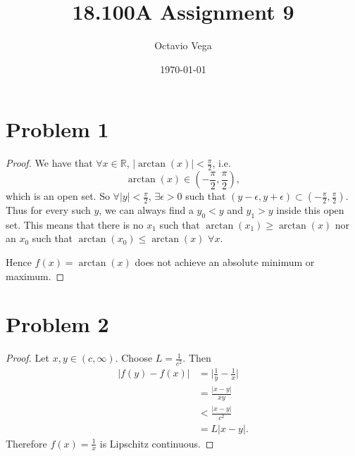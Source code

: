 \documentclass{article}
\title{18.100A Assignment 9}
\author{Octavio Vega}
\date\today
\newcommand{\R}{\mathbb{R}} %
\begin{document}
\maketitle

\section*{Problem 1}
\begin{proof}
	We have that $\forall x \in \R$, $|\arctan(x)| < \frac{\pi}{2}$, i.e.
	\begin{equation}
		\arctan(x) \in \left(-\frac{\pi}{2}, \frac{\pi}{2}\right),
	\end{equation}
	which is an open set. So $\forall |y| < \frac{\pi}{2}$, $\exists \epsilon > 0$ such that $(y - \epsilon, y + \epsilon) \subset (-\frac{\pi}{2}, \frac{\pi}{2})$. Thus for every such $y$, we can always find a $y_0 < y$ and $y_1 > y$ inside this open set. This means that there is no $x_1$ such that $\arctan(x_1) \geq \arctan(x)$ nor an $x_0$ such that $\arctan(x_0) \leq \arctan(x)$ $\forall x$.
	
	Hence $f(x) = \arctan(x)$ does not achieve an absolute minimum or maximum.
\end{proof}
\section*{Problem 2}
\begin{proof}
	Let $x, y \in (c, \infty)$. Choose $L = \frac{1}{c^2}$. Then
	\begin{align}
		|f(y) - f(x)| &= \big|\frac{1}{y} - \frac{1}{x}\big| \\
		&= \frac{|x - y|}{xy} \\
		&< \frac{|x - y|}{c^2} \\
		&= L |x - y|.
	\end{align}
	Therefore $f(x) = \frac{1}{x}$ is Lipschitz continuous.
\end{proof}
\end{document}
